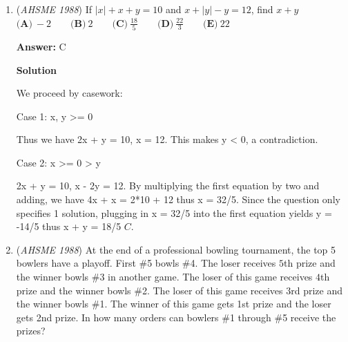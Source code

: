 \begin{enumerate}
Let $\triangle ABC$ have side length $s$ and $\triangle A'B'C'$ have side length $t$. Thus the altitude of $\triangle ABC$ is $\frac{s\sqrt{3}}{2}$. Now observe that this altitude is made up of three parts: the distance from $BC$ to $B'C'$, plus the altitude of $\triangle A'B'C'$, plus a top part which is equal to the length of the diagonal line from the bottom-left corner of $\triangle ABC$ to the bottom left corner of $\triangle A'B'C'$ (as an isosceles trapezium is formed with parallel sides $AB$ and $A'B'$, and legs $AA'$ and $BB'$). We drop a perpendicular from $B'$ to $BC$, which meets $BC$ at $D$. $\triangle BDB'$ has angles $30^{\circ}$, $60^{\circ}$, and $90^{\circ}$, and the vertical side is that distance from $BC$ to $B'C'$, which is given as $\frac{1}{6} \times \frac{s\sqrt{3}}{2} = \frac{s\sqrt{3}}{12}$, so that by the length relationships in a 30-60-90 triangle,, the length of the diagonal line is $\frac{s\sqrt{3}}{12} \times 2 = \frac{s\sqrt{3}}{6}.$ Thus using the "altitude in three parts" idea, we get $\frac{s\sqrt{3}}{2} = \frac{s\sqrt{3}}{12} + \frac{t\sqrt{3}}{2} + \frac{s\sqrt{3}}{6} \implies \frac{s\sqrt{3}}{4} = \frac{t\sqrt{3}}{2} \implies t = \frac{1}{2}s.$ Thus the sides of $\triangle A'B'C'$ are half as long as $\triangle ABC$, so the area ratio is $(\frac{1}{2}) ^ {2} = \frac{1}{4}$, which is $\boxed{\text{C}}$.

 


	\item (\textit{AHSME 1988}) If $|x| + x + y = 10$ and $x + |y| - y = 12$, find $x + y$
$\textbf{(A)}\ -2\qquad \textbf{(B)}\ 2\qquad \textbf{(C)}\ \frac{18}{5}\qquad \textbf{(D)}\ \frac{22}{3}\qquad \textbf{(E)}\ 22$

 \textbf{Answer: }C



\textbf{Solution}

We proceed by casework:

 Case 1: x, y >= 0

 Thus we have 2x + y = 10, x = 12. This makes y < 0, a contradiction.

 Case 2: x >= 0 > y

 2x + y = 10, x - 2y = 12. By multiplying the first equation by two and adding, we have 4x + x = 2*10 + 12 thus x = 32/5. Since the question only specifies 1 solution, plugging in x = 32/5 into the first equation yields y = -14/5 thus x + y = 18/5 $C$.

 


	\item (\textit{AHSME 1988}) At the end of a professional bowling tournament, the top 5 bowlers have a playoff. 
First \#5 bowls \#4. The loser receives $5$th prize and the winner bowls \#3 in another game. 
The loser of this game receives $4$th prize and the winner bowls \#2. 
The loser of this game receives $3$rd prize and the winner bowls \#1. 
The winner of this game gets 1st prize and the loser gets 2nd prize. 
In how many orders can bowlers \#1 through \#5 receive the prizes?



\end{enumerate}
